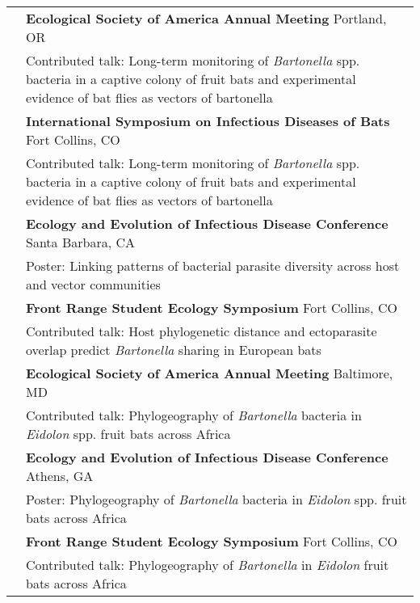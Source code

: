 \documentclass[letterpaper]{deedy-resume} %
\begin{document}
\begin{tabular}{>{\raggedright\arraybackslash}p{2cm}p{16cm}}
2017 & \textbf{Ecological Society of America Annual Meeting} Portland, OR\\
	& Contributed talk: Long-term monitoring of \textit{Bartonella} spp. bacteria in a captive colony of fruit bats and experimental evidence of bat flies as vectors of bartonella\\

2017 & \textbf{International Symposium on Infectious Diseases of Bats} Fort Collins, CO\\
	& Contributed talk: Long-term monitoring of \textit{Bartonella} spp. bacteria in a captive colony of fruit bats and experimental evidence of bat flies as vectors of bartonella\\
	
2017 & \textbf{Ecology and Evolution of Infectious Disease Conference} Santa Barbara, CA\\
	& Poster: Linking patterns of bacterial parasite diversity across host and vector communities\\

2017 & \textbf{Front Range Student Ecology Symposium} Fort Collins, CO\\
	& Contributed talk: Host phylogenetic distance and ectoparasite overlap predict \textit{Bartonella} sharing in European bats\\

2015 & \textbf{Ecological Society of America Annual Meeting} Baltimore, MD\\
	& Contributed talk: Phylogeography of \textit{Bartonella} bacteria in \textit{Eidolon} spp. fruit bats across Africa\\

2015 & \textbf{Ecology and Evolution of Infectious Disease Conference} Athens, GA\\
	& Poster: Phylogeography of \textit{Bartonella} bacteria in \textit{Eidolon} spp. fruit bats across Africa\\
	
2015 & \textbf{Front Range Student Ecology Symposium} Fort Collins, CO\\
	& Contributed talk: Phylogeography of \textit{Bartonella} in \textit{Eidolon} fruit bats across Africa\\

\end{tabular}
\end{document}
